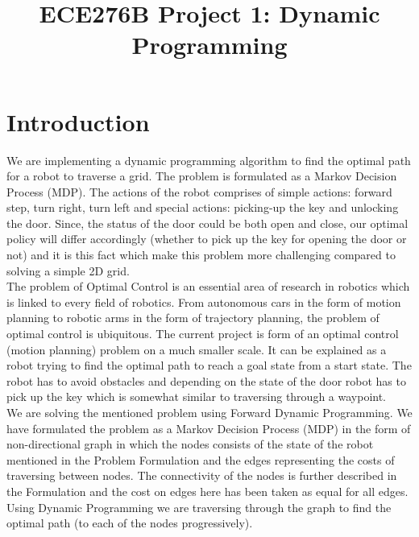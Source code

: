 \documentclass[conference]{IEEEtran}
\begin{document}
\title{ECE276B Project 1: Dynamic Programming}

\author{
}

\maketitle
\begin{abstract}

\end{abstract}

\section{Introduction}
We are implementing a dynamic programming algorithm to find the optimal path for a robot to traverse a grid. The problem is formulated as a Markov Decision Process (MDP). The actions of the robot comprises of simple actions: forward step, turn right, turn left and special actions: picking-up the key and unlocking the door. Since, the status of the door could be both open and close, our optimal policy will differ accordingly (whether to pick up the key for opening the door or not) and it is this fact which make this problem more challenging compared to solving a simple 2D grid. \\
The problem of Optimal Control is an essential area of research in robotics which is linked to every field of robotics. From autonomous cars in the form of motion planning to robotic arms in the form of trajectory planning, the problem of optimal control is ubiquitous. The current project is form of an optimal control (motion planning) problem on a much smaller scale. It can be explained as a robot trying to find the optimal path to reach a goal state from a start state. The robot has to avoid obstacles and depending on the state of the door robot has to pick up the key which is somewhat similar to traversing through a waypoint. \\
We are solving the mentioned problem using Forward Dynamic Programming. We have formulated the problem as a Markov Decision Process (MDP) in the form of non-directional graph in which the nodes consists of the state of the robot mentioned in the Problem Formulation and the edges representing the costs of traversing between nodes. The connectivity of the nodes is further described in the Formulation and the cost on edges here has been taken as equal for all edges. Using Dynamic Programming we are traversing through the graph to find the optimal path (to each of the nodes progressively).
\end{document}
